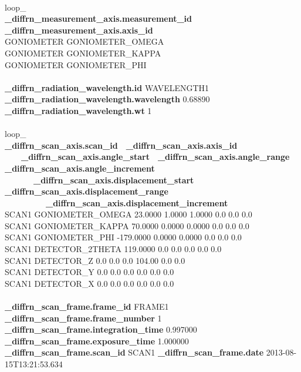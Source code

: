 \documentclass[11pt]{a0poster}
\begin{document}
\begin{minipage}[]{0.29\linewidth}
\\
loop\_\\
{\bf \_diffrn\_measurement\_axis.measurement\_id  \_diffrn\_measurement\_axis.axis\_id}\\
 GONIOMETER GONIOMETER\_OMEGA\\
 GONIOMETER GONIOMETER\_KAPPA\\
 GONIOMETER GONIOMETER\_PHI\\
\\
{\bf \_diffrn\_radiation\_wavelength.id} WAVELENGTH1  {\bf \_diffrn\_radiation\_wavelength.wavelength} 0.68890  {\bf \_diffrn\_radiation\_wavelength.wt} 1\\
\\
loop\_\\
{\bf \_diffrn\_scan\_axis.scan\_id}~~{\bf \_diffrn\_scan\_axis.axis\_id}\\
\-\ ~~~{\bf \_diffrn\_scan\_axis.angle\_start}~~{\bf \_diffrn\_scan\_axis.angle\_range}~~{\bf \_diffrn\_scan\_axis.angle\_increment}\\
\-\ ~~~~~~{\bf \_diffrn\_scan\_axis.displacement\_start}  {\bf \_diffrn\_scan\_axis.displacement\_range}\\
\-\ ~~~~~~~~~{\bf \_diffrn\_scan\_axis.displacement\_increment}\\
 SCAN1 GONIOMETER\_OMEGA 23.0000 1.0000 1.0000 0.0 0.0 0.0\\
 SCAN1 GONIOMETER\_KAPPA 70.0000 0.0000 0.0000 0.0 0.0 0.0\\
 SCAN1 GONIOMETER\_PHI -179.0000 0.0000 0.0000 0.0 0.0 0.0\\
 SCAN1 DETECTOR\_2THETA 119.0000 0.0 0.0 0.0 0.0 0.0\\
 SCAN1 DETECTOR\_Z 0.0 0.0 0.0 104.00 0.0 0.0\\
 SCAN1 DETECTOR\_Y 0.0 0.0 0.0 0.0 0.0 0.0\\
 SCAN1 DETECTOR\_X 0.0 0.0 0.0 0.0 0.0 0.0\\
\\
{\bf \_diffrn\_scan\_frame.frame\_id} FRAME1  {\bf \_diffrn\_scan\_frame.frame\_number} 1\\
{\bf \_diffrn\_scan\_frame.integration\_time} 0.997000  {\bf \_diffrn\_scan\_frame.exposure\_time} 1.000000\\
{\bf \_diffrn\_scan\_frame.scan\_id} SCAN1  {\bf \_diffrn\_scan\_frame.date} 2013-08-15T13:21:53.634\\
\\
\vspace{-4mm}%


\end{minipage}
\end{document}
